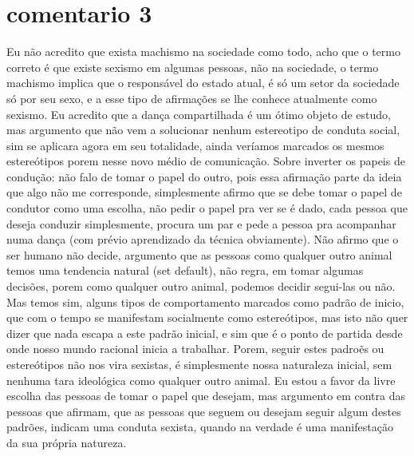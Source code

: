 \documentclass[a4paper,10pt]{article}
\begin{document}
\section{comentario 3}
\begin{comment}
Fiquei interessado no seu caso no congresso, gostaria souber que tipo de punição receberam, quanto tempo durou a punição, e qual foi o motivo que argumentaram para aplicar em vocês. 
\end{comment}
Eu não acredito que exista machismo na sociedade como todo, acho que o termo correto é que existe sexismo em algumas pessoas, não na sociedade, o termo machismo implica que o responsável do estado atual, é só um setor da sociedade só por seu sexo, e a esse tipo de afirmações se lhe conhece atualmente como sexismo. Eu acredito que a dança compartilhada é um ótimo objeto de estudo, mas argumento que não vem a solucionar nenhum estereotipo de conduta social, sim se aplicara agora em seu totalidade, ainda veríamos marcados os mesmos estereótipos porem nesse novo médio de comunicação. Sobre inverter os papeis de condução: não falo de tomar o papel do outro, pois essa afirmação parte da ideia que algo não me corresponde, simplesmente afirmo que se debe tomar o papel de condutor como uma escolha, não pedir o papel pra ver se é dado, cada pessoa que deseja conduzir simplesmente, procura um par e pede a pessoa pra acompanhar numa dança (com prévio aprendizado da técnica obviamente). Não afirmo que o ser humano não decide, argumento que as pessoas como qualquer outro animal temos uma tendencia natural (set default), não regra, em tomar algumas decisões, porem como qualquer outro animal, podemos decidir segui-las ou não. Mas temos sim, alguns tipos de comportamento marcados como padrão de inicio, que com o tempo se manifestam socialmente como estereótipos, mas isto não quer dizer que nada escapa a este padrão inicial, e sim que é o ponto de partida desde onde nosso mundo racional inicia a trabalhar. Porem, seguir estes padroẽs ou estereótipos não nos vira sexistas, é simplesmente nossa naturaleza inicial, sem nenhuma tara ideológica como qualquer outro animal. Eu estou a favor da livre escolha das pessoas de tomar o papel que desejam, mas argumento em contra das pessoas que afirmam, que as pessoas que seguem ou desejam seguir algum destes padrões, indicam uma conduta sexista, quando na verdade é uma manifestação da sua própria natureza.﻿
\end{document}
